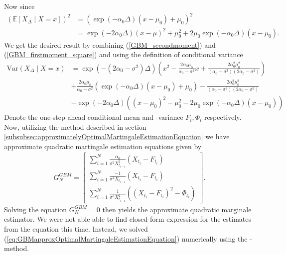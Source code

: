 Now since 
\begin{align}
    \left(\mathbb{E}\left[X_\Delta\middle|X=x\right]\right)^2 &= \left(\exp\left(-\alpha_0\Delta\right)\left(x-\mu_0\right) + \mu_0\right)^2 \nonumber\\
    &= \exp\left(-2\alpha_0\Delta\right)\left(x-\mu\right)^2 + \mu_0^2 + 2\mu_0\exp\left(-\alpha_0\Delta\right)\left(x-\mu_0\right). \label{GBM_firstmoment_square}
\end{align}
We get the desired result by combining (\ref{GBM_secondmoment}) and (\ref{GBM_firstmoment_square}) and using the definition of conditional variance
\begin{align}
    \mathrm{Var}\left(X_\Delta \middle| X = x\right) &= \exp\left(-\left(2\alpha_0 - \sigma^2\right)\Delta\right)\left(x^2 - \frac{2\alpha_0\mu_0}{\alpha_0-\sigma^2}x + \frac{2\alpha_0^2 \mu_0^2}{\left(\alpha_0-\sigma^2\right)\left(2\alpha_0 - \sigma^2\right)}\right) \nonumber \\
    &+ \frac{2\alpha_0\mu_0}{\alpha_0-\sigma^2}\left(\exp\left(-\alpha_0\Delta\right)\left(x-\mu_0\right) + \mu_0\right) - \frac{2\alpha_0^2\mu_0^2}{\left(\alpha_0-\sigma^2\right)\left(2\alpha_0 - \sigma^2\right)} \nonumber\\
    &- \exp\left(-2\alpha_0\Delta\right)\left(\left(x-\mu_0\right)^2 - \mu_0^2 - 2\mu_0\exp\left(-\alpha_0\Delta\right)\left(x-\mu_0\right)\right)
\end{align} 
Denote the one-step ahead conditional mean and -variance $F_i, \Phi_i$ respectively. Now, utilizing the method described in section \ref{subsubsec:approximatelyOptimalMartingaleEstimationEquation} we have approximate quadratic martingale estimation equations given by
\begin{align}
    G_N^{GBM} = \begin{bmatrix}
        \sum_{i = 1}^N \frac{\alpha_0}{\sigma^2 X_{t_{i-1}}^2}\left(X_{t_i} - F_{t_i}\right)\\
        \sum_{i = 1}^N \frac{-1}{\sigma^2 X_{t_{i-1}}}\left(X_{t_i} - F_{t_i}\right)\\
        \sum_{i = 1}^N \frac{1}{\sigma^3 X_{t_{i-1}}^2}\left(\left(X_{t_i} - F_{t_i}\right)^2 - \Phi_{t_i}\right)
    \end{bmatrix}. \label{eq:GBMapproxOptimalMartingaleEstimationEquation}
\end{align}
Solving the equation $G_N^{GBM} = 0$ then yields the approximate quadratic marginale estimator. We were not able able to find closed-form expression for the estimates from the equation this time. Instead, we solved (\ref{eq:GBMapproxOptimalMartingaleEstimationEquation}) numerically using the -method\cite{nleqslv}.
